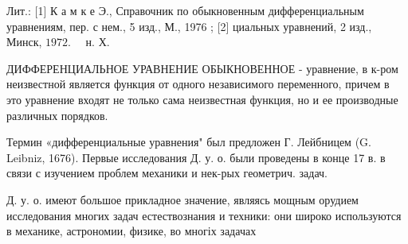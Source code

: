 \documentclass[10pt]{article}
\begin{document}
Лит.: [1] К а м к е Э., Справочник по обыкновенным дифференциальным уравнениям, пер. с нем., 5 изд., М., 1976 ; [2] циальных уравнений, 2 изд., Минск, $1972 . \quad$ н. $Х$.



ДИФФЕРЕНЦИАЛЬНОЕ УРАВНЕНИЕ ОБЫКНОВЕННОЕ - уравнение, в к-ром неизвестной является функция от одного независимого переменного, причем в это уравнение входят не только сама неизвестная функция, но и ее производные различных порядков.



Термин «дифференциальные уравнения" был предложен Г. Лейбницем (G. Leibniz, 1676). Первые исследования Д. у. о. были проведены в конце 17 в. в связи с изучением проблем механики и нек-рых геометрич. задач.



Д. у. о. имеют большое прикладное значение, являясь мощным орудием исследования многих задач естествознания и техники: они широко используются в механике, астрономии, физике, во многіх задачах
\end{document}
